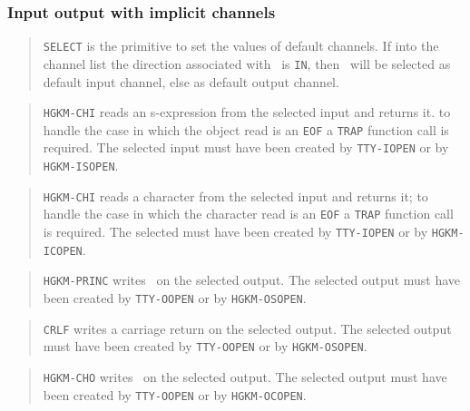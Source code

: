 \subsubsection{Input output with implicit channels}

\begin{quote}
	{\tt SELECT} is the primitive to set the values of default channels.
	If into the channel list the direction associated with \chan\ is {\tt IN},
	then \chan\ will be selected as default input channel, else as default
	output channel.
\end{quote}

\begin{quote}
	{\tt HGKM-CHI} reads an s-expression from the selected input and returns it.
	to handle the case in which the object read is an {\tt EOF} a {\tt TRAP}
	function call is required.
	The selected input must have been created by {\tt TTY-IOPEN} or by {\tt
	HGKM-ISOPEN}. 
\end{quote}

\begin{quote}
	{\tt HGKM-CHI} reads a character from the selected input and returns it; to
	handle the case in which the character read is an {\tt EOF} a {\tt TRAP}
	function call is required.
	The selected must have been created by {\tt TTY-IOPEN} or by
	{\tt HGKM-ICOPEN}. 
\end{quote}

\begin{quote}
	{\tt HGKM-PRINC} writes \obj\ on the selected output.
	The selected output must have been created by {\tt TTY-OOPEN} or by
	{\tt HGKM-OSOPEN}.
\end{quote}

\begin{quote}
	{\tt CRLF} writes a carriage return on the selected output.
	The selected output must have been created by {\tt TTY-OOPEN} or by
	{\tt HGKM-OSOPEN}.
\end{quote}

\begin{quote}
	{\tt HGKM-CHO} writes \chr\ on the selected output.
	The selected output must have been created by {\tt TTY-OOPEN} or by
	{\tt HGKM-OCOPEN}.
\end{quote}

